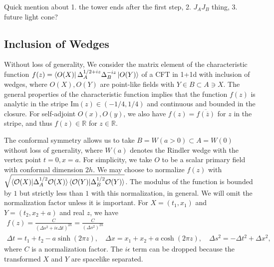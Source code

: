 \documentclass[a4paper,11pt]{article}
\theoremstyle{definition}
\newcommand{\mO}{\mathcal{O}}
\newcommand{\ep}{\epsilon}
\begin{document}
Quick mention about 1. the tower ends after the first step, 2. $J_AJ_B$ thing, 3. future light cone?
\subsection{Inclusion of Wedges}
Without loss of generality, We consider the matrix element of the characteristic function $f(z)=\bra{O(X)}\Delta_A^{1/2+iz}\Delta_B^{-iz}\ket{O(Y)}$ of a CFT in 1+1d with inclusion of wedges, where $O(X),O(Y)$ are point-like fields with $Y\in B \subset A\ni X$. The general properties of the characteristic function implies that the function $f(z)$ is analytic in the stripe Im$(z)\in (-1/4,1/4)$ and continuous and bounded in the closure. For self-adjoint $O(x), O(y)$, we also have $f(z) = \overline{f(\overline{z})}$ for $z$ in the stripe, and thus $f(z)\in\mathbb{R}$ for $z\in\mathbb{R}$.

The conformal symmetry allows us to take $B = W(a>0) \subset A = W(0)$ without loss of generality, where $W(a)$ denotes the Rindler wedge with the vertex point $t=0,x=a$. For simplicity, we take $O$ to be a scalar primary field with conformal dimension $2h$. We may choose to normalize $f(z)$ with $\sqrt{\braket{\mO(X)|\Delta_A^{1/2}\mO(X)}\braket{\mO(Y)|\Delta_B^{1/2}\mO(Y)}}$. The modulus of the function is bounded by $1$ but strictly less than $1$ with this normalization, in general. We will omit the normalization factor unless it is important. For $X = (t_1,x_1)$ and $Y = (t_2,x_2+a)$ and real $z$, we have 
\begin{gather}
    f(z) =\frac{C}{(\Delta s^2+i\ep\Delta t)^{2h}} = \frac{C}{(\Delta s^2)^{2h}}\\ %
    \Delta t = t_1+t_2-a\sinh(2\pi z), \quad \Delta x =x_1+x_2 + a\cosh(2\pi z), \quad \Delta s^2 = -\Delta t^2 + \Delta x^2, %
\end{gather}
where $C$ is a normalization factor. The $i\ep$ term can be dropped because the transformed $X$ and $Y$ are spacelike separated.
\end{document}
